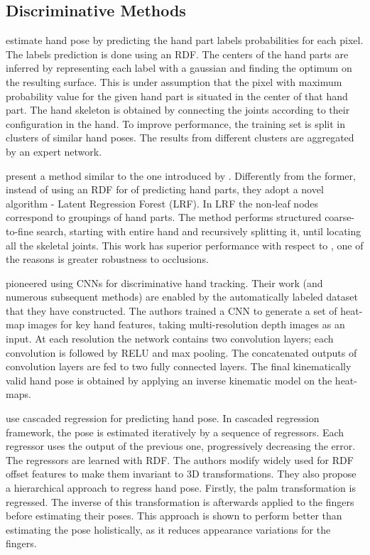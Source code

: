 \subsection{Discriminative Methods}

\hspace{-0.4em}
\textbf{\cite{keskin2012hand}} estimate hand pose by predicting the hand part labels probabilities for each pixel. The labels prediction is done using an RDF. The centers of the hand parts are inferred by representing each label with a gaussian and finding the optimum on the resulting surface. This is under assumption that the pixel with maximum probability value for the given hand part is situated in the center of that hand part. The hand skeleton is obtained by connecting the joints according to their configuration in the hand. To improve performance, the training set is split in clusters of similar hand poses. The results from different clusters are aggregated by an expert network.
   
\hspace{-0.4em}
\textbf{\cite{tang_cvpr14}} present a method similar to the one introduced by \cite{keskin2012hand}. Differently from the former, instead of using an RDF for of predicting hand parts, they adopt a novel algorithm -  Latent Regression Forest (LRF). In LRF the non-leaf nodes correspond to groupings of hand parts. The method performs structured coarse-to-fine search, starting with entire hand and recursively splitting it, until locating all the skeletal joints. This work has superior performance with respect to \cite{keskin2012hand}, one of the reasons is greater robustness to occlusions.

\hspace{-0.4em}
\textbf{\cite{tompson2014real}} pioneered using CNNs for discriminative hand tracking. Their work (and numerous subsequent methods) are enabled by the automatically labeled dataset that they have constructed. The authors trained a CNN to generate a set of heat-map images for key hand features, taking multi-resolution depth images as an input. At each resolution the network contains two convolution layers; each convolution is followed by RELU and max pooling. The concatenated outputs of convolution layers are fed to two fully connected layers. The final kinematically valid hand pose is obtained by applying an inverse kinematic model on the heat-maps.

\hspace{-0.4em}
\textbf{\cite{sun2015cascaded}} use cascaded regression for predicting hand pose. In cascaded regression framework, the pose is estimated iteratively by a sequence of regressors. Each regressor uses the output of the previous one, progressively decreasing the error. The regressors are learned with RDF. The authors modify widely used for RDF offset features to make them invariant to 3D transformations. They also propose a hierarchical approach to regress hand pose. Firstly, the palm transformation is regressed. The inverse of this transformation is afterwards applied to the fingers before estimating their poses. This approach is shown to perform better than estimating the pose holistically, as it reduces appearance variations for the fingers.

